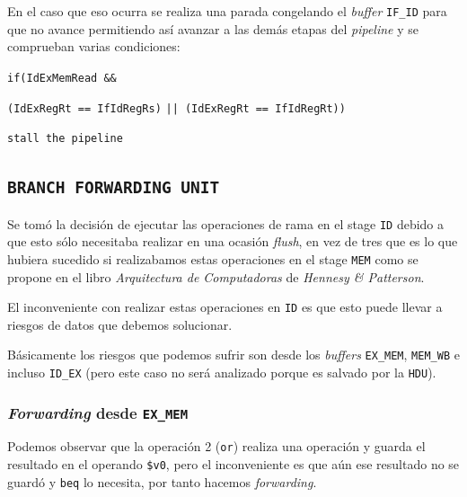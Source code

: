 \documentclass[a4paper]{article}
\begin{document}
En el caso que eso ocurra se realiza una parada congelando el \textit{buffer} \texttt{IF\_ID} para que no avance permitiendo así avanzar a las demás etapas del \textit{pipeline} y se comprueban varias condiciones:

\texttt{if(IdExMemRead \&\&}

\texttt{(IdExRegRt == IfIdRegRs)}
\texttt{|| (IdExRegRt == IfIdRegRt))}

\texttt{stall the pipeline}

\subsection{\texttt{BRANCH FORWARDING UNIT}}

Se tomó la decisión de ejecutar las operaciones de rama en el stage \texttt{ID} debido a que esto sólo necesitaba realizar en una ocasión \textit{flush}, en vez de tres que es lo que hubiera sucedido si realizabamos estas operaciones en el stage \texttt{MEM} como se propone en el libro \textit{Arquitectura de Computadoras} de \textit{Hennesy \& Patterson}.

El inconveniente con realizar estas operaciones en \texttt{ID} es que esto puede llevar a riesgos de datos que debemos solucionar.

Básicamente los riesgos que podemos sufrir son desde los \textit{buffers} \texttt{EX\_MEM}, \texttt{MEM\_WB} e incluso \texttt{ID\_EX} (pero este caso no será analizado porque es salvado por la \texttt{HDU}). 

\subsubsection{\textit{Forwarding} desde \texttt{EX\_MEM}}
Podemos observar que la operación 2 (\texttt{or}) realiza una operación y guarda el resultado en el operando \texttt{\$v0}, pero el inconveniente es que aún ese resultado no se guardó y \texttt{beq} lo necesita, por tanto hacemos \textit{forwarding}.
\end{document}
